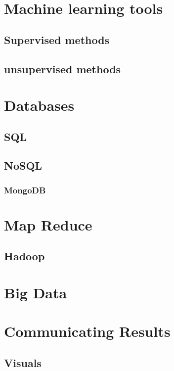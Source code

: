\documentclass[10pt]{PhDthesisPSnPDF}%
\begin{document}
\chapter{Machine learning tools}\label{MLearn}
\section{Supervised methods}
\section{unsupervised methods}
\chapter{Databases}\label{databases}
\section{SQL}
\section{NoSQL}
\subsection{MongoDB}
\chapter{Map Reduce}\label{mapR}
\section{Hadoop}
\chapter{Big Data}\label{bigData}
\chapter{Communicating Results}\label{Commun}
\section{Visuals}\label{Visuals}






\end{document}
